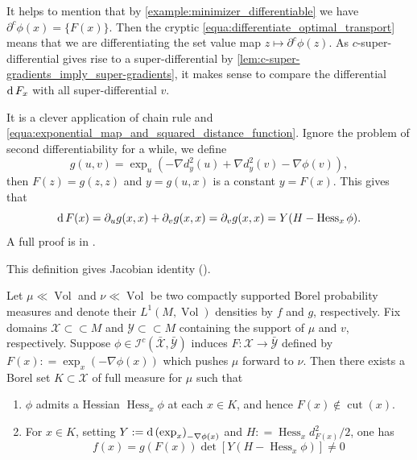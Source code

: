 It helps to mention that by \cref{example:minimizer_differentiable} we have
$\partial^c \phi (x) = \{ F(x) \}$.
Then the cryptic \cref{equa:differentiate_optimal_transport} means that we are differentiating
the set value map $z \mapsto \partial^c \phi(z)$.
As $c$-super-differential gives rise to a super-differential by \cref{lem:c-super-gradients_imply_super-gradients},
it makes sense to compare the differential $\operatorname{d} F_x$ with all super-differential $v$.
\begin{rmk}

	It is a clever application of chain rule and \cref{equa:exponential_map_and_squared_distance_function}.
	Ignore the problem of second differentiability for a while, we define
	\[
		g(u,v) = \exp_{u}(-\nabla d_y^2(u) + \nabla d_y^2(v) - \nabla \phi (v)),
	\]
	then $F(z) = g(z, z)$ and $ y = g(u, x) $ is a constant $y = F(x)$.
	This gives that
	\[
		\operatorname{d} F(x) = \partial_u g(x, x) + \partial_v g(x, x) = \partial_v g(x, x) = Y(H - \operatorname{Hess}_x \phi).
	\]
	A full proof is in \cite[Proposition 4.1]{cordero2001riemannian}.
\end{rmk}

This definition gives Jacobian identity (\cite[Theorem 4.2]{cordero2001riemannian}).

\begin{thm}
	\label{thm:jacobian_identity}
	Let \( \mu \ll \operatorname{Vol} \) and \( \nu \ll \operatorname{Vol} \) be
	two compactly supported Borel probability measures and denote their
	\( L ^ { 1 } ( M, \operatorname{Vol}) \) densities by \( f \) and \( g \), respectively.
	Fix domains \( \mathcal{X} \subset \subset M \) and \( \mathcal{Y} \subset \subset M \) containing the support of \( \mu \) and \( v \), respectively.
	Suppose \( \phi \in \mathcal{I} ^ { c } ( \bar { \mathcal{X} } , \bar { \mathcal{Y} } ) \) induces
	\( F : \mathcal{X} \rightarrow \bar { \mathcal{Y} } \) defined by \( F ( x ) : = \exp _ { x } ( - \nabla \phi ( x ) ) \)
	which pushes \( \mu \) forward to $\nu$.
	Then there exists a Borel set \( K \subset \mathcal{X} \) of full
	measure for \( \mu \) such that
	\begin{enumerate}
		\item $\phi$ admits a Hessian \( \operatorname { Hess } _ { x } \phi \) at each \( x \in K \), and hence \( F ( x ) \notin \operatorname { cut } ( x ) \).
		\item For \( x \in K \), setting \( Y : = \operatorname{d} \left( \exp _ { x } \right) _ { - \nabla \phi ( x ) } \) and \( H : = \operatorname { Hess } _ { x } d _ { F ( x ) } ^ { 2 } / 2 \), one
		      has
		      \[ f ( x ) = g ( F ( x ) ) \operatorname { det } \left[ Y \left( H - \operatorname { Hess } _ { x } \phi \right) \right] \neq 0 \]
	\end{enumerate}
\end{thm}

